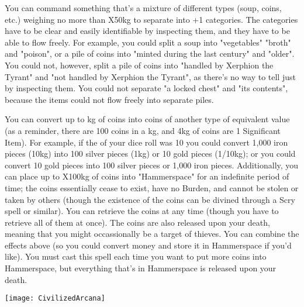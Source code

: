 {\MYSTERY [
  Name = Divvy,
  Link = arcana-mystery-divvy,
  Paradigm = Entropy,
  Save = N,
  Duration = Permanent,
  Target = Close Target(s)
]

You can command something that's a mixture of different types (soup, coins, etc.) weighing no more than \DICE X50kg to separate into \DICE+1 categories.  The categories have to be clear and easily identifiable by inspecting them, and they have to be able to flow freely.  For example, you could split a soup into "vegetables" "broth" and "poison", or a pile of coins into "minted during the last century" and "older". You could not, however, split a pile of coins into "handled by Xerphion the Tyrant" and "not handled by Xerphion the Tyrant", as there's no way to tell just by inspecting them. You could not separate "a locked chest" and "its contents", because the items could not flow freely into separate piles.


\MYSTERY [
  Name = Exchequer,
  Link = arcana-mystery-exchequer,
  Paradigm = Entropy,
  Save = N,
  Duration = Instant,
  Target = Close Target(s)
]

You can convert up to \SUMDICE kg of coins into coins of another type of equivalent value (as a reminder, there are 100 coins in a kg, and 4kg of coins are 1 Significant Item). For example, if the \SUMDICE of your dice roll was 10 you could convert 1,000 iron pieces (10kg) into 100 silver pieces (1kg) or 10 gold pieces (1/10kg); or you could convert 10 gold pieces into 100 silver pieces or 1,000 iron pieces. Additionally, you can place up to \DICE X100kg of coins into "Hammerspace" for an indefinite period of time; the coins essentially cease to exist, have no Burden, and cannot be stolen or taken by others (though the existence of the coins can be divined through a Scry spell or similar).  You can retrieve the coins at any time (though you have to retrieve all of them at once).  The coins are also released upon your death, meaning that you might occassionally be a target of thieves.
You can combine the effects above (so you could convert money and store it in Hammerspace if you'd like).  You must cast this spell each time you want to put more coins into Hammerspace, but everything that's in Hammerspace is released upon your death.

  \begin{center}
  \texttt{[image: CivilizedArcana]}
  \end{center}



\MYSTERY [
  Name = Forgehammer,
  Link = arcana-mystery-forgehammer,
  Paradigm = Force,
  Save = N,
  Duration = Session,
  Target = Self
]

}
